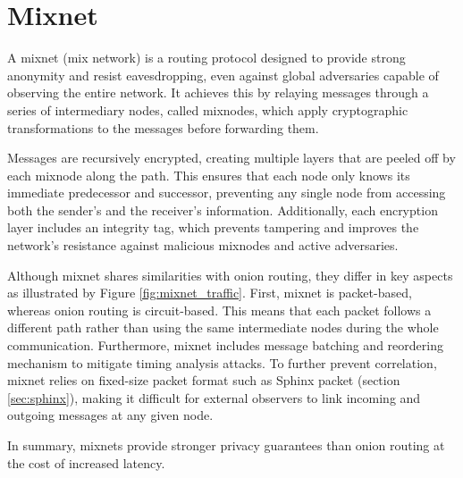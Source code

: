 \section{Mixnet}

A mixnet (mix network) is a routing protocol designed to provide strong anonymity and resist eavesdropping, even against global adversaries capable of observing the entire network. 
It achieves this by relaying messages through a series of intermediary nodes, called mixnodes, which apply cryptographic transformations to the messages before forwarding them.


Messages are recursively encrypted, creating multiple layers that are peeled off by each mixnode along the path. 
This ensures that each node only knows its immediate predecessor and successor, preventing any single node from accessing both the sender's and the receiver's information. 
Additionally, each encryption layer includes an integrity tag, which prevents tampering and improves the network’s resistance against malicious mixnodes and active adversaries.

Although mixnet shares similarities with onion routing, they differ in key aspects as illustrated by Figure \ref{fig:mixnet_traffic}.
First, mixnet is packet-based, whereas onion routing is circuit-based. 
This means that each packet follows a different path rather than using the same intermediate nodes during the whole communication.
Furthermore, mixnet includes message batching and reordering mechanism to mitigate timing analysis attacks. 
To further prevent correlation, mixnet relies on fixed-size packet format such as Sphinx packet (section \ref{sec:sphinx}), making it difficult for external observers to link incoming and outgoing messages at any given node.

In summary, mixnets provide stronger privacy guarantees than onion routing at the cost of increased latency.

